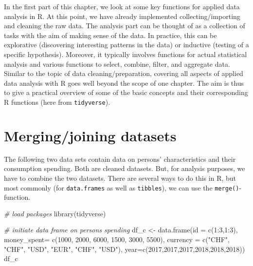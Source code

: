 \documentclass[
  12pt,
]{style/krantz}
\newenvironment{Shaded}{\begin{snugshade}}{\end{snugshade}}
\newcommand{\AttributeTok}[1]{\textcolor[rgb]{0.77,0.63,0.00}{#1}}
\newcommand{\CommentTok}[1]{\textcolor[rgb]{0.56,0.35,0.01}{\textit{#1}}}
\newcommand{\DecValTok}[1]{\textcolor[rgb]{0.00,0.00,0.81}{#1}}
\newcommand{\FunctionTok}[1]{\textcolor[rgb]{0.00,0.00,0.00}{#1}}
\newcommand{\NormalTok}[1]{#1}
\newcommand{\OtherTok}[1]{\textcolor[rgb]{0.56,0.35,0.01}{#1}}
\newcommand{\SpecialCharTok}[1]{\textcolor[rgb]{0.00,0.00,0.00}{#1}}
\newcommand{\StringTok}[1]{\textcolor[rgb]{0.31,0.60,0.02}{#1}}
\begin{document}
In the first part of this chapter, we look at some key functions for applied data analysis in R. At this point, we have already implemented collecting/importing and cleaning the raw data. The analysis part can be thought of as a collection of tasks with the aim of making sense of the data. In practice, this can be explorative (discovering interesting patterns in the data) or inductive (testing of a specific hypothesis). Moreover, it typically involves functions for actual statistical analysis and various functions to select, combine, filter, and aggregate data. Similar to the topic of data cleaning/preparation, covering all aspects of applied data analysis with R goes well beyond the scope of one chapter. The aim is thus to give a practical overview of some of the basic concepts and their corresponding R functions (here from \texttt{tidyverse}).

\hypertarget{mergingjoining-datasets}{%
\section{Merging/joining datasets}\label{mergingjoining-datasets}}

The following two data sets contain data on persons' characteristics and their consumption spending. Both are cleaned datasets. But, for analysis purposes, we have to combine the two datasets. There are several ways to do this in R, but most commonly (for \texttt{data.frames} as well as \texttt{tibbles}), we can use the \texttt{merge()}-function.

\begin{Shaded}
\begin{Highlighting}[]
\CommentTok{\# load packages}
\FunctionTok{library}\NormalTok{(tidyverse)}

\CommentTok{\# initiate data frame on persons\textquotesingle{} spending}
\NormalTok{df\_c }\OtherTok{\textless{}{-}} \FunctionTok{data.frame}\NormalTok{(}\AttributeTok{id =} \FunctionTok{c}\NormalTok{(}\DecValTok{1}\SpecialCharTok{:}\DecValTok{3}\NormalTok{,}\DecValTok{1}\SpecialCharTok{:}\DecValTok{3}\NormalTok{),}
                   \AttributeTok{money\_spent=} \FunctionTok{c}\NormalTok{(}\DecValTok{1000}\NormalTok{, }\DecValTok{2000}\NormalTok{, }\DecValTok{6000}\NormalTok{, }\DecValTok{1500}\NormalTok{, }\DecValTok{3000}\NormalTok{, }\DecValTok{5500}\NormalTok{),}
                   \AttributeTok{currency =} \FunctionTok{c}\NormalTok{(}\StringTok{"CHF"}\NormalTok{, }\StringTok{"CHF"}\NormalTok{, }\StringTok{"USD"}\NormalTok{, }\StringTok{"EUR"}\NormalTok{, }\StringTok{"CHF"}\NormalTok{, }\StringTok{"USD"}\NormalTok{),}
                   \AttributeTok{year=}\FunctionTok{c}\NormalTok{(}\DecValTok{2017}\NormalTok{,}\DecValTok{2017}\NormalTok{,}\DecValTok{2017}\NormalTok{,}\DecValTok{2018}\NormalTok{,}\DecValTok{2018}\NormalTok{,}\DecValTok{2018}\NormalTok{))}
\NormalTok{df\_c}
\end{Highlighting}
\end{Shaded}
\end{document}
